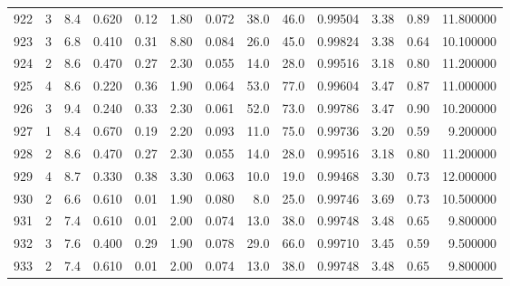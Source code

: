 \begin{tabular}{lrrrrrrrrrrrr}
922  &        3 &            8.4 &             0.620 &         0.12 &            1.80 &      0.072 &                 38.0 &                  46.0 &  0.99504 &  3.38 &       0.89 &  11.800000 \\
923  &        3 &            6.8 &             0.410 &         0.31 &            8.80 &      0.084 &                 26.0 &                  45.0 &  0.99824 &  3.38 &       0.64 &  10.100000 \\
924  &        2 &            8.6 &             0.470 &         0.27 &            2.30 &      0.055 &                 14.0 &                  28.0 &  0.99516 &  3.18 &       0.80 &  11.200000 \\
925  &        4 &            8.6 &             0.220 &         0.36 &            1.90 &      0.064 &                 53.0 &                  77.0 &  0.99604 &  3.47 &       0.87 &  11.000000 \\
926  &        3 &            9.4 &             0.240 &         0.33 &            2.30 &      0.061 &                 52.0 &                  73.0 &  0.99786 &  3.47 &       0.90 &  10.200000 \\
927  &        1 &            8.4 &             0.670 &         0.19 &            2.20 &      0.093 &                 11.0 &                  75.0 &  0.99736 &  3.20 &       0.59 &   9.200000 \\
928  &        2 &            8.6 &             0.470 &         0.27 &            2.30 &      0.055 &                 14.0 &                  28.0 &  0.99516 &  3.18 &       0.80 &  11.200000 \\
929  &        4 &            8.7 &             0.330 &         0.38 &            3.30 &      0.063 &                 10.0 &                  19.0 &  0.99468 &  3.30 &       0.73 &  12.000000 \\
930  &        2 &            6.6 &             0.610 &         0.01 &            1.90 &      0.080 &                  8.0 &                  25.0 &  0.99746 &  3.69 &       0.73 &  10.500000 \\
931  &        2 &            7.4 &             0.610 &         0.01 &            2.00 &      0.074 &                 13.0 &                  38.0 &  0.99748 &  3.48 &       0.65 &   9.800000 \\
932  &        3 &            7.6 &             0.400 &         0.29 &            1.90 &      0.078 &                 29.0 &                  66.0 &  0.99710 &  3.45 &       0.59 &   9.500000 \\
933  &        2 &            7.4 &             0.610 &         0.01 &            2.00 &      0.074 &                 13.0 &                  38.0 &  0.99748 &  3.48 &       0.65 &   9.800000 \\

\end{tabular}
